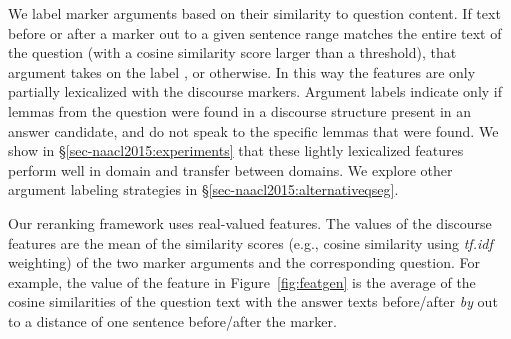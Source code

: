 {} 
We label marker arguments based on their similarity to question content.
If text before or after a marker out to a given sentence range matches the entire text of the question (with a cosine similarity score larger than a threshold), that argument takes on the label , or  otherwise.  
In this way the features are only partially lexicalized with the discourse markers. Argument labels indicate only if lemmas from the question were found in a discourse structure present in an answer candidate, and do not speak to the specific lemmas that were found. We show in \S\ref{sec-naacl2015:experiments} that these lightly lexicalized features perform well in domain and transfer between domains. We explore other argument labeling strategies in \S\ref{sec-naacl2015:alternativeqseg}.


{}
Our reranking framework uses real-valued features. 
The values of the discourse features are the mean of the similarity scores (e.g., cosine similarity using {\em tf.idf} weighting) of the two marker arguments and the corresponding question. For example, the value of the  feature in Figure~\ref{fig:featgen} is the average of the cosine similarities of the question text with the answer texts before/after {\em by} out to a distance of one sentence before/after the marker.%

